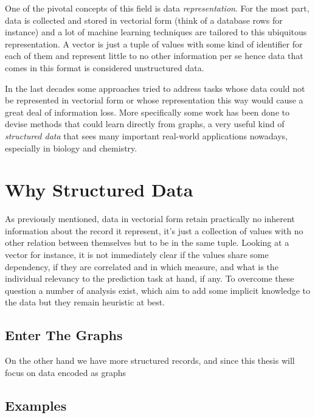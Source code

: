 One of the pivotal concepts of this field is data \emph{representation}.
For the most part, data is collected and stored in vectorial form (think of
a database rows for instance) and a lot of machine learning techniques are
tailored to this ubiquitous representation.
A vector is just a tuple of values with some kind of identifier for each of them
and represent little to no other information per se hence data that comes in
this format is considered unstructured data.

In the last decades some approaches tried to address tasks whose data could
not be represented in vectorial form or whose representation this way would cause
a great deal of information loss.
More specifically some work has been done to devise methods that could learn
directly from graphs, a very useful kind of \emph{structured data} that sees many
important real-world applications nowadays, especially in biology and chemistry.


\section{Why Structured Data}
As previously mentioned, data in vectorial form retain practically no inherent
information about the record it represent, it's just a collection of values with
no other relation between themselves but to be in the same tuple.
Looking at a vector for instance, it is not immediately clear if the values share
some dependency, if they are correlated and in which measure, and what is the
individual relevancy to the prediction task at hand, if any.
To overcome these question a number of analysis exist, which aim to add some
implicit knowledge to the data but they remain heuristic at best.

\subsection{Enter The Graphs}
On the other hand we have more structured records, and since this thesis will
focus on data encoded as graphs

\subsection{Examples}


